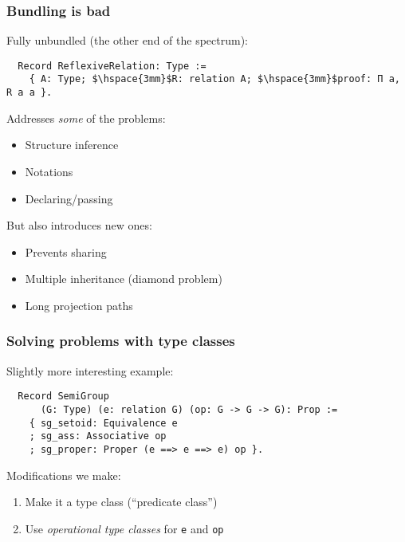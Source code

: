 \documentclass{beamer}
\begin{document}
\begin{frame}[fragile]
\frametitle{Bundling is bad}

Fully {\color{blue}unbundled} (the other end of the spectrum):
\begin{lstlisting}
  Record ReflexiveRelation: Type :=
    { A: Type; $\hspace{3mm}$R: relation A; $\hspace{3mm}$proof: Π a, R a a }.
\end{lstlisting}
Addresses \emph{some} of the problems:
\begin{itemize}
\item Structure inference %
\item Notations %
\item Declaring/passing
\end{itemize}
\pause
But also introduces new ones:
\begin{itemize}
\item Prevents sharing
\item Multiple inheritance (diamond problem)
\item Long projection paths
\end{itemize}
\end{frame}

\begin{frame}[fragile]
\frametitle{Solving problems with type classes}

Slightly more interesting example:
\begin{lstlisting}
  Record SemiGroup
      (G: Type) (e: relation G) (op: G -> G -> G): Prop :=
    { sg_setoid: Equivalence e
    ; sg_ass: Associative op
    ; sg_proper: Proper (e ==> e ==> e) op }.
\end{lstlisting}

\pause

Modifications we make:
\begin{enumerate}
\item Make it a type class (``predicate class'')
\item Use \emph{operational type classes} for \lstinline|e| and \lstinline|op|
\end{enumerate}

\end{frame}
\end{document}
